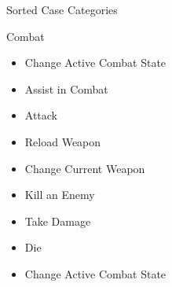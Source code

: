 \documentclass[12pt]{article}
\begin{document}
\begin{section}{Sorted Case Categories}
\begin{subsection}{Combat}
\begin{itemize}
\item Change Active Combat State
\item Assist in Combat
\item Attack
\item Reload Weapon
\item Change Current Weapon
\item Kill an Enemy
\item Take Damage
\item Die
\item Change Active Combat State
\end{itemize}
\end{subsection}
\end{section}
\end{document}
